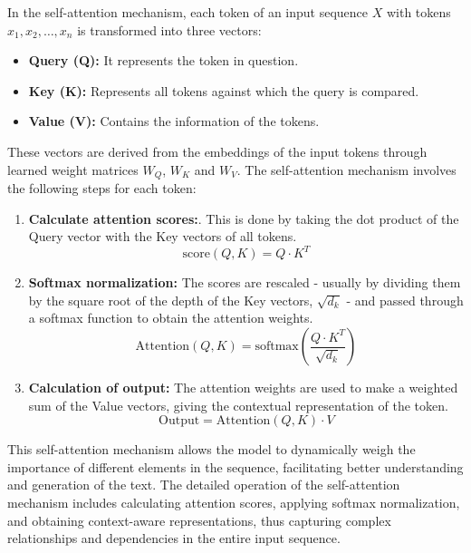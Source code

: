 In the self-attention mechanism, each token of an input sequence \( X \) with tokens \( x_1, x_2, \ldots, x_n \) is transformed into three vectors:
\begin{itemize}
    \item \textbf{Query (Q):} It represents the token in question.
    \item \textbf{Key (K):} Represents all tokens against which the query is compared.
    \item \textbf{Value (V):} Contains the information of the tokens.
\end{itemize}

These vectors are derived from the embeddings of the input tokens through learned weight matrices \( W_Q \), \( W_K \) and \( W_V \). The self-attention mechanism involves the following steps for each token:

\begin{enumerate}
    \item \textbf{Calculate attention scores:}. This is done by taking the dot product of the Query vector with the Key vectors of all tokens.
    \begin{equation}
        \text{score}(Q, K) = Q \cdot K^T
    \end{equation}
    
    \item \textbf{Softmax normalization:} The scores are rescaled - usually by dividing them by the square root of the depth of the Key vectors, \( \sqrt{d_k} \) - and passed through a softmax function to obtain the attention weights.
    \begin{equation}
        \text{Attention}(Q, K) = \text{softmax}\left(\frac{Q \cdot K^T}{\sqrt{d_k}} \right)
    \end{equation}
    
    \item \textbf{Calculation of output:} The attention weights are used to make a weighted sum of the Value vectors, giving the contextual representation of the token.
    \begin{equation}
        \text{Output} = \text{Attention}(Q, K) \cdot V
    \end{equation}
\end{enumerate}

This self-attention mechanism allows the model to dynamically weigh the importance of different elements in the sequence, facilitating better understanding and generation of the text. The detailed operation of the self-attention mechanism includes calculating attention scores, applying softmax normalization, and obtaining context-aware representations, thus capturing complex relationships and dependencies in the entire input sequence. \cite{geeksforgeeks2024-sa}

